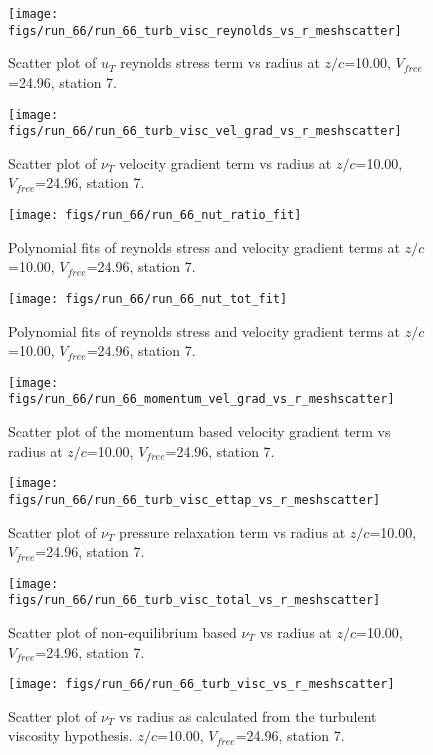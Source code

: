 \begin{figure}[H]
\centering
\texttt{[image: figs/run\_66/run\_66\_turb\_visc\_reynolds\_vs\_r\_meshscatter]}
\caption{Scatter plot of $
u_T$ reynolds stress term vs radius at $z/c$=10.00, $V_{free}$=24.96, station 7.}
\end{figure}


\begin{figure}[H]
\centering
\texttt{[image: figs/run\_66/run\_66\_turb\_visc\_vel\_grad\_vs\_r\_meshscatter]}
\caption{Scatter plot of $\nu_T$ velocity gradient term vs radius at $z/c$=10.00, $V_{free}$=24.96, station 7.}
\end{figure}


\begin{figure}[H]
\centering
\texttt{[image: figs/run\_66/run\_66\_nut\_ratio\_fit]}
\caption{Polynomial fits of reynolds stress and velocity gradient terms at $z/c$=10.00, $V_{free}$=24.96, station 7.}
\end{figure}


\begin{figure}[H]
\centering
\texttt{[image: figs/run\_66/run\_66\_nut\_tot\_fit]}
\caption{Polynomial fits of reynolds stress and velocity gradient terms at $z/c$=10.00, $V_{free}$=24.96, station 7.}
\end{figure}


\begin{figure}[H]
\centering
\texttt{[image: figs/run\_66/run\_66\_momentum\_vel\_grad\_vs\_r\_meshscatter]}
\caption{Scatter plot of the momentum based velocity gradient term vs radius at $z/c$=10.00, $V_{free}$=24.96, station 7.}
\end{figure}


\begin{figure}[H]
\centering
\texttt{[image: figs/run\_66/run\_66\_turb\_visc\_ettap\_vs\_r\_meshscatter]}
\caption{Scatter plot of $\nu_T$ pressure relaxation term vs radius at $z/c$=10.00, $V_{free}$=24.96, station 7.}
\end{figure}


\begin{figure}[H]
\centering
\texttt{[image: figs/run\_66/run\_66\_turb\_visc\_total\_vs\_r\_meshscatter]}
\caption{Scatter plot of non-equilibrium based $\nu_T$ vs radius at $z/c$=10.00, $V_{free}$=24.96, station 7.}
\end{figure}


\begin{figure}[H]
\centering
\texttt{[image: figs/run\_66/run\_66\_turb\_visc\_vs\_r\_meshscatter]}
\caption{Scatter plot of $\nu_T$ vs radius as calculated from the turbulent viscosity hypothesis. $z/c$=10.00, $V_{free}$=24.96, station 7.}
\end{figure}


